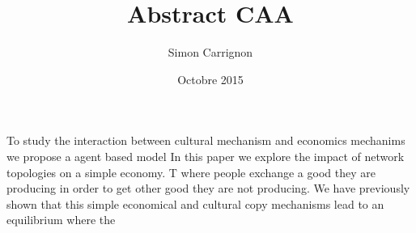 \documentclass[a4paper]{article}
\title{Abstract CAA}
\author{Simon Carrignon}
\date{Octobre 2015}
\begin{document}
To study the interaction between cultural mechanism and economics mechanims we propose a agent based model 
In this paper we explore the impact of network topologies on a simple economy. T where people exchange a good they are producing in order to get other good they are not producing. We have previously shown that this simple economical and cultural copy mechanisms lead to an equilibrium where the  
\end{document}
